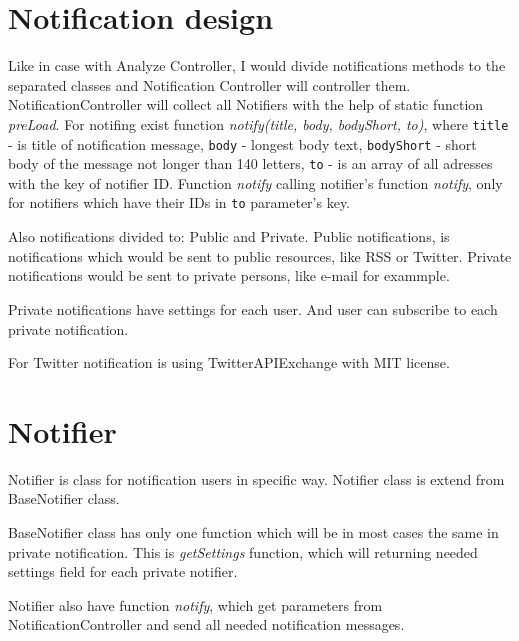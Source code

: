 \documentclass[a4paper,11pt]{article}
\begin{document}
\section{Notification design}

Like in case with Analyze Controller, I would divide notifications methods to the separated classes and Notification Controller will controller them. NotificationController will collect all Notifiers with the help of static function \emph{preLoad}. For notifing exist function \emph{notify(title, body, bodyShort, to)}, where \texttt{title} - is title of notification message, \texttt{body} - longest body text, \texttt{bodyShort} - short body of the message not longer than 140 letters, \texttt{to} - is an array of all adresses with the key of notifier ID. Function \emph{notify} calling notifier's function \emph{notify}, only for notifiers which have their IDs in \texttt{to} parameter's key.

Also notifications divided to: Public and Private. Public notifications, is notifications which would be sent to public resources, like RSS or Twitter. Private notifications would be sent to private persons, like e-mail for exammple.

Private notifications have settings for each user. And user can subscribe to each private notification.

For Twitter notification is using TwitterAPIExchange with MIT license.

\section{Notifier}

Notifier is class for notification users in specific way. Notifier class is extend from BaseNotifier class.

BaseNotifier class has only one function which will be in most cases the same in private notification. This is \emph{getSettings} function, which will returning needed settings field for each private notifier. 

Notifier also have function \emph{notify}, which get parameters from NotificationController and send all needed notification messages.    
\end{document}
